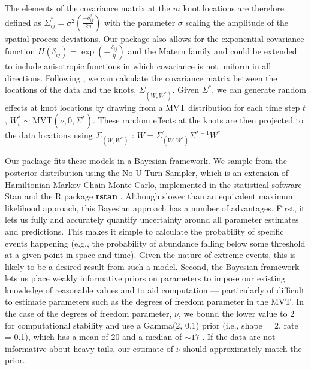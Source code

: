 \documentclass[12pt,english]{article}
\begin{document}
\begin{spacing}{1.3}
The elements of the covariance matrix at the $m$ knot locations are therefore
defined as $\Sigma_{ij}^*=\sigma^2 \left( \frac{-\delta_{ij}^2}{2 \eta} \right)$ with the
parameter $\sigma$ scaling the amplitude of the spatial process deviations. Our
package also allows for the exponential covariance function $H(\delta_{ij}) =
\exp \left(-\frac{\delta_{ij} }{\eta} \right)$ and the Matern family and could be
extended to include anisotropic functions in which covariance is not uniform
in all directions. Following \citet{latimer2009}, we can calculate the
covariance matrix between the locations of the data and the knots,
$\Sigma_{\left(W, W^* \right)}$.
Given $\Sigma^*$, we can generate random effects at knot
locations by drawing from a MVT distribution for each time step $t$,
$W_t^*\sim \mathrm{MVT}\left( \nu, 0, \Sigma^{*} \right)$.
These random effects at the knots are then projected to the data locations using
$\Sigma_{\left( W,W^{*} \right)}$ \citep{latimer2009}:
$W=\Sigma_{\left(W,W^* \right)}^{'} \Sigma^{*-1}W^*$.

Our package fits these models in a Bayesian framework. We sample
from the posterior distribution using the No-U-Turn Sampler, which is an
extension of Hamiltonian Markov Chain Monte Carlo, implemented in the
statistical software Stan \citep{standevelopmentteam2016a, carpenter2017}
and the R package \textbf{rstan} \citep{standevelopmentteam2016}. Although slower
than an equivalent maximum likelihood approach, this Bayesian approach has a
number of advantages. First, it lets us fully and accurately quantify
uncertainty around all parameter estimates and predictions. This makes it
simple to calculate the probability of specific events happening (e.g., the
probability of abundance falling below some threshold at a given point in space
and time). Given the nature of extreme events, this is likely to be a desired
result from such a model. Second, the Bayesian framework lets us place weakly
informative priors on parameters to impose our existing knowledge of reasonable
values and to aid computation --- particularly of difficult to estimate
parameters such as the degrees of freedom parameter in the MVT. In the case of
the degrees of freedom parameter, $\nu$, we bound the lower value to $2$ for
computational stability and use a Gamma(2, 0.1) prior (i.e., shape = 2, rate = 0.1),
which has a mean of $20$ and a median of $\sim 17$ \citep{juarez2010}.
If the data are not informative about heavy
tails, our estimate of $\nu$ should approximately match the prior.


\end{spacing}
\end{document}
